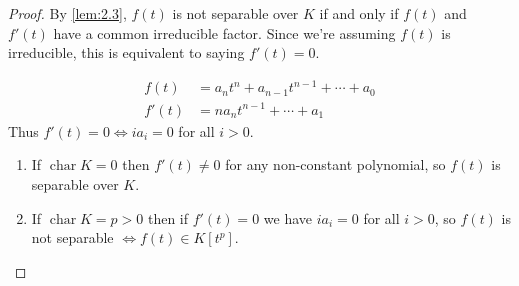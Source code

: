 \documentclass{article}
\DeclareMathOperator{\chara}{char}
\begin{document}
\begin{proof}
    By \cref{lem:2.3}, $f(t)$ is not separable over $K$ if and only if $f(t)$ and $f'(t)$ have a common irreducible factor.
    Since we're assuming $f(t)$ is irreducible, this is equivalent to saying $f'(t) = 0$.

    \begin{align*}
        f(t) &= a_n t^n + a_{n-1} t^{n-1} + \dotsb + a_0 \\
        f'(t) &= n a_n t^{n-1} + \dotsb + a_1
    \end{align*}
    Thus $f'(t) = 0 \iff i a_i = 0$ for all $i > 0$.

    \begin{enumerate}[label=(\roman*)]
        \item If $\chara K = 0$ then $f'(t) \neq 0$ for any non-constant polynomial, so $f(t)$ is separable over $K$.
        \item If $\chara K = p > 0$ then if $f'(t) = 0$ we have $i a_i = 0$ for all $i > 0$, so $f(t)$ is not separable $\iff f(t) \in K[t^p]$. \qedhere
    \end{enumerate}
\end{proof}
\end{document}
